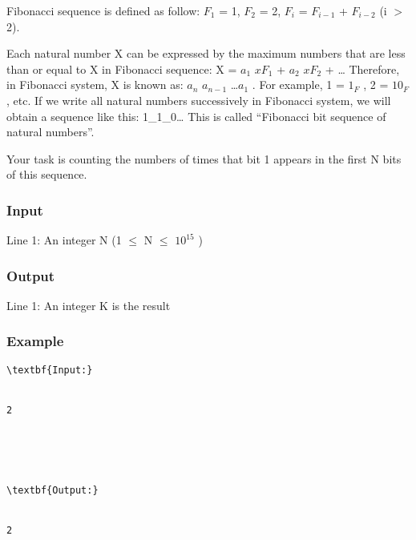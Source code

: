 



   Fibonacci sequence is defined as follow: $F_{1}$   = 1, $F_{2}$   = 2, $F_{i}$   = $F_{i-1}$   + $F_{i-2}$   (i $>$ 2).  

   Each natural number X can be expressed by the maximum numbers that are less than or equal to X in Fibonacci sequence: X = $a_{1}$   $xF_{1}$   + $a_{2}$   $xF_{2}$   + … Therefore, in Fibonacci system, X is known as: $a_{n}$   $a_{n-1}$   …$a_{1}$   . For example, 1 = $1_{F}$   , 2 = $10_{F}$   , etc. If we write all natural numbers successively in Fibonacci system, we will obtain a sequence like this: 1\_1\_0… This is called “Fibonacci bit sequence of natural numbers”.  

   Your task is counting the numbers of times that bit 1 appears in the first N bits of this sequence.  

\subsubsection{   Input  }

   Line 1: An integer N (1  $\le$  N  $\le$  $10^{15}$   )  

\subsubsection{   Output  }

   Line 1: An integer K is the result  

\subsubsection{   Example  }
\begin{verbatim}
\textbf{Input:}


2





\textbf{Output:}


2


\end{verbatim}
